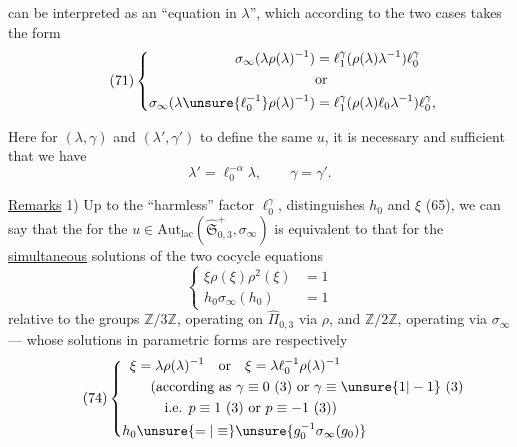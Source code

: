 
can be interpreted as an ``equation in $\lambda$'', which according to the two cases takes the form
\[
\tag{71}
\left\{
\begin{aligned}
\sigma_\infty(\lambda\rho(\lambda)^{-1})
 &=\ell_1^\gamma(\rho(\lambda)\lambda^{-1})\ell_0^\gamma\\
&\text{or}\\
\sigma_\infty(\lambda\unsure{\ell_0^{-1}}\rho(\lambda)^{-1})
 &=\ell_1^\gamma(\rho(\lambda)\ell_0\lambda^{-1})\ell_0^\gamma,
\end{aligned}
\right.
\]

Here for $(\lambda,\gamma)$ and $(\lambda',\gamma')$ to define the same $u$, it is necessary and sufficient that we have 
\[
\tag{72}
\lambda'=\ell_0^{-\alpha}\lambda,\qquad\gamma=\gamma'.
\]

\uline{Remarks} 1) Up to the ``harmless'' factor $\ell_0^\gamma$,  distinguishes $h_0$ and $\xi$ (65), we can say that the  for the
$u\in\mathrm{Aut}_{\mathrm{lac}}(\widehat{\mathfrak S}_{0,3}^{+},\sigma_\infty)$
is equivalent to that for the  \uline{simultaneous} solutions of the two cocycle equations
\[
\tag{73}
\left\{
\begin{aligned}
\xi\rho(\xi)\rho^2(\xi)&=1\\
h_0\sigma_\infty(h_0)&=1
\end{aligned}
\right.
\]
relative  to the groups $\mathbb Z/3\mathbb Z$, operating on $\widehat{\Pi}_{0,3}$ via $\rho$, and $\mathbb Z/2\mathbb Z$, operating via $\sigma_\infty$ --- whose solutions in parametric forms are respectively
\[
\tag{74}
\left\{
\begin{aligned}
\xi&=\lambda\rho(\lambda)^{-1}\quad\text{or}\quad
 \xi=\lambda \ell_0^{-1}\rho(\lambda)^{-1}\\
&\quad\text{(according as }\gamma\equiv0\ (3)\text{ or }\gamma\equiv\unsure{1|-1}\ (3)\\
&\qquad\text{i.e. }p\equiv1\ (3)\text{ or }p\equiv-1\ (3)\text{)}\\
h_0&\unsure{=|\equiv}\unsure{g_0^{-1}\sigma_\infty(g_0)}
\end{aligned}
\right.
\]

